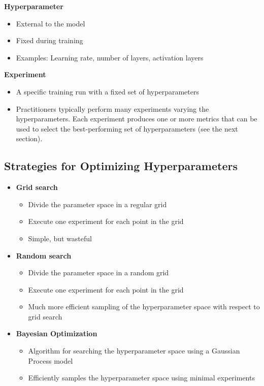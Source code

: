 \textbf{Hyperparameter}
\begin{itemize}
    \item External to the model
    \item Fixed during training
    \item Examples: Learning rate, number of layers, activation layers
\end{itemize}

\textbf{Experiment}
\begin{itemize}
    \item A specific training run with a fixed set of hyperparameters
    \item Practitioners typically perform many experiments varying the hyperparameters. Each experiment produces one or more metrics that can be used to select the best-performing set of hyperparameters (see the next section).
\end{itemize}

\subsection{Strategies for Optimizing Hyperparameters}

\begin{itemize}
    \item \textbf{Grid search}

\begin{itemize}
        \item Divide the parameter space in a regular grid
        \item Execute one experiment for each point in the grid
        \item Simple, but wasteful
\end{itemize}

    \item \textbf{Random search}

\begin{itemize}
        \item Divide the parameter space in a random grid
        \item Execute one experiment for each point in the grid
        \item Much more efficient sampling of the hyperparameter space with respect to grid search
\end{itemize}

    \item \textbf{Bayesian Optimization}

\begin{itemize}
        \item Algorithm for searching the hyperparameter space using a Gaussian Process model
        \item Efficiently samples the hyperparameter space using minimal experiments
\end{itemize}

\end{itemize}

